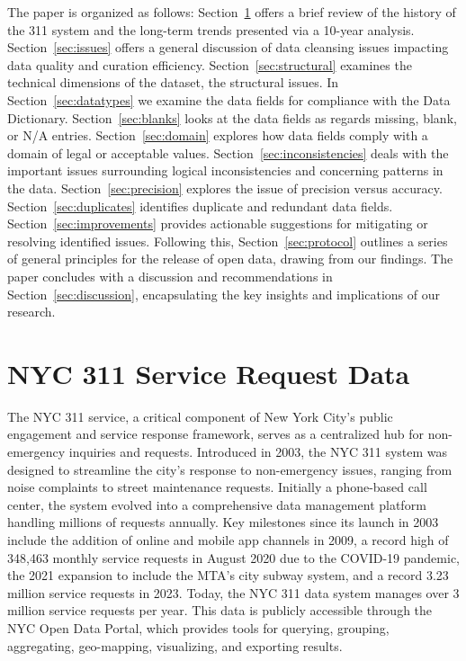\documentclass[12pt, titlepage]{article}
\begin{document}
The paper is organized as follows:
Section~\ref{sec:data} offers a brief review of the history of the 311
system and the long-term trends presented via a 10-year analysis.
Section~\ref{sec:issues} offers a 
general discussion of data cleansing issues impacting data 
quality and curation efficiency. Section~\ref{sec:structural} examines
the technical dimensions of the dataset, the structural issues. 
In Section~\ref{sec:datatypes} we examine the data fields for compliance 
with the Data Dictionary. Section~\ref{sec:blanks} looks at the 
data fields as regards missing, blank, or N/A entries. Section~\ref{sec:domain} 
explores how data fields comply with a domain of legal 
or acceptable values. Section~\ref{sec:inconsistencies} deals 
with the important issues surrounding logical inconsistencies 
and concerning patterns in the data. Section~\ref{sec:precision} 
explores the issue of precision versus accuracy. Section~\ref{sec:duplicates}
identifies duplicate and redundant data fields. Section~\ref{sec:improvements} provides 
actionable suggestions for mitigating or resolving identified issues. 
Following this, Section~\ref{sec:protocol} outlines a series of general 
principles for the release of open data, drawing from our findings. The 
paper concludes with a discussion and recommendations in 
Section~\ref{sec:discussion}, encapsulating the key insights and 
implications of our research.



\section{NYC 311 Service Request Data} 
\label{sec:data}
The NYC 311 service, a critical component of New York City's public
engagement and service response framework, serves as a centralized hub
for non-emergency inquiries and requests. Introduced in 2003, the NYC
311 system was designed to streamline the city's response to
non-emergency issues, ranging from noise complaints to street
maintenance requests. Initially a phone-based call center, the system
evolved into a comprehensive data management platform handling
millions of requests annually. Key milestones since its launch in 2003
include the addition of online and mobile app channels in 2009, a
record high of 348,463 monthly service requests in August 2020 due to
the COVID-19 pandemic, the 2021 expansion to include the MTA's city
subway system, and a record 3.23 million service requests in
2023. Today, the NYC 311 data system manages over 3 million service
requests per year. This data is publicly accessible through the NYC Open Data
Portal, which provides tools for querying, grouping, aggregating,
geo-mapping, visualizing, and exporting results.
\end{document}

